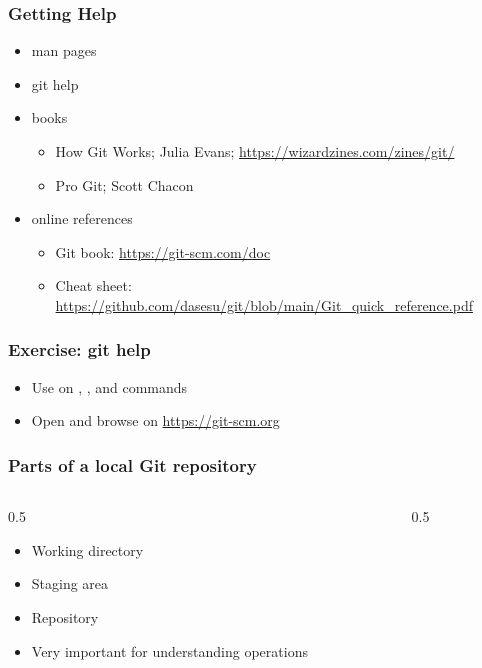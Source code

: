 \begin{frame}
\frametitle{Getting Help}
\begin{itemize}
    \item man pages
    \item git help
    \item books
    \begin{itemize}
        \item How Git Works; Julia Evans; \url{https://wizardzines.com/zines/git/}
        \item Pro Git; Scott Chacon
    \end{itemize}
    \item online references
    \begin{itemize}
        \item Git book: \url{https://git-scm.com/doc}
        \item Cheat sheet: \url{https://github.com/dasesu/git/blob/main/Git_quick_reference.pdf}
    \end{itemize}
\end{itemize}
\end{frame}

\begin{frame}
\frametitle{Exercise: git help}
\begin{itemize}
    \item Use  on , ,  and
         commands
    \item Open and browse on \url{https://git-scm.org}
\end{itemize}
\end{frame}

\begin{frame}[fragile]
\frametitle{Parts of a local Git repository}
\begin{columns}[T]
    \begin{column}{0.5\textwidth}
        \begin{itemize}
            \item Working directory
            \item Staging area
            \item Repository
            \item Very important for understanding operations
        \end{itemize}
    \end{column}

    \begin{column}{0.5\textwidth}
        \begin{center}
            \resizebox{!}{0.7\textheight}{%
                
            }
        \end{center}
    \end{column}
\end{columns}
\end{frame}

